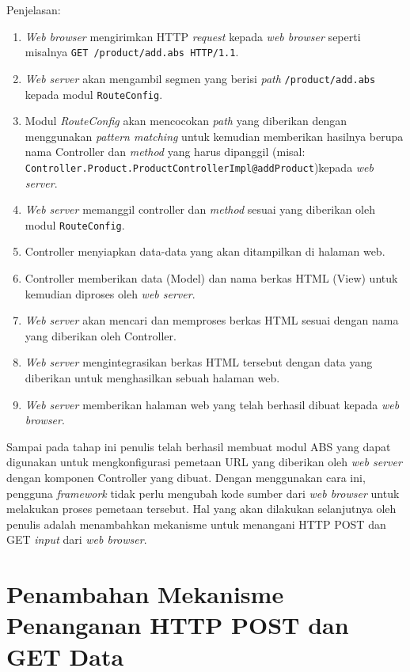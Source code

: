 Penjelasan:
\begin{enumerate}
    \item \textit{Web browser} mengirimkan HTTP \textit{request} kepada \textit{web browser} seperti misalnya \texttt{GET /product/add.abs HTTP/1.1}.
    \item \textit{Web server} akan mengambil segmen yang berisi \textit{path} \texttt{/product/add.abs} kepada modul \texttt{RouteConfig}.
    \item Modul \textit{RouteConfig} akan mencocokan \textit{path} yang diberikan dengan menggunakan \textit{pattern matching} untuk kemudian memberikan hasilnya berupa nama Controller dan \textit{method} yang harus dipanggil (misal: \texttt{Controller.Product.ProductControllerImpl@addProduct})kepada \textit{web server}.
    \item \textit{Web server} memanggil controller dan \textit{method} sesuai yang diberikan oleh modul \texttt{RouteConfig}.
    \item Controller menyiapkan data-data yang akan ditampilkan di halaman web.
    \item Controller memberikan data (Model) dan nama berkas HTML (View) untuk kemudian diproses oleh \textit{web server}.
    \item \textit{Web server} akan mencari dan memproses berkas HTML sesuai dengan nama yang diberikan oleh Controller.
    \item \textit{Web server} mengintegrasikan berkas HTML tersebut dengan data yang diberikan untuk menghasilkan sebuah halaman web.
    \item \textit{Web server} memberikan halaman web yang telah berhasil dibuat kepada \textit{web browser}.
\end{enumerate}

Sampai pada tahap ini penulis telah berhasil membuat modul ABS yang dapat digunakan untuk mengkonfigurasi pemetaan URL yang diberikan oleh \textit{web server} dengan komponen Controller yang dibuat. Dengan menggunakan cara ini, pengguna \textit{framework} tidak perlu mengubah kode sumber dari \textit{web browser} untuk melakukan proses pemetaan tersebut. Hal yang akan dilakukan selanjutnya oleh penulis adalah menambahkan mekanisme untuk menangani HTTP POST dan GET \textit{input} dari \textit{web browser}.

\section{Penambahan Mekanisme Penanganan HTTP POST dan GET Data}

